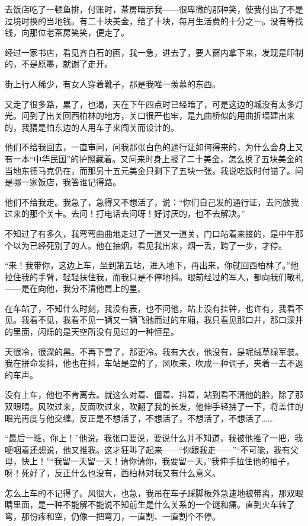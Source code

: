 \par 去饭店吃了一顿鱼排，付账时，茶房暗示我——很卑微的那种笑，使我付出了不是过境时换的当地钱。有二十块美金，给了十块，每月生活费的十分之一。没有等找钱，向那位老茶房笑笑，便走了。
\par 经过一家书店，看见齐白石的画，我一急，进去了，要人窗内拿下来，发现是印制的，不是原墨，就谢了走开。
\par 街上行人稀少，有女人穿着靴子，那是我唯一羡慕的东西。
\par 又走了很多路，累了，也渴，天在下午四点时已经暗了，可是这边的城没有太多灯光。问到了出关回西柏林的地方，关口很严也牢，是九曲桥似的用曲折墙建出来的，我猜是怕东边的人用车子来闯关而设计的。
\par 他们不给我回去，一直审问，问我那张白色的通行证如何得来的，为什么会身上又有一本“中华民国”的护照藏着。又问来时身上报了二十美金，怎么换了五块美金的当地东德马克仍在，而那另十五元美金只剩下了五块一张。我说吃饭时付错了。问是哪一家饭店，我答谁记得路。
\par 他们不给我走。我急了，急得又不想活了，说：“你们自己发的通行证，去问放我过来的那个关卡。去问！打电话去问呀！好讨厌的，也不去解决。”
\par 不知过了有多久，我弯弯曲曲地走过了一道又一道关，门口站着来接的，是中午那个以为已经死别了的人。他在抽烟，看见我出来，烟一丢，跨了一步，才停。
\par “来！我带你，这边上车，坐到第五站，进入地下，再出来，你就回西柏林了。”他拉住我的手臂，轻轻扶住我，而我只是不停地抖。眼前经过的军人，都向我们敬礼——是在向他，我分不清他肩上的星。
\par 在车站了，不知什么时刻，我没有表，也不问他，站上没有挂钟，也许有，我看不见。我看不见，我看不见一辆又一辆飞驰而过的车厢，我只看见那口井，那口深井的里面，闪烁的是天空所没有见过的一种恒星。
\par 天很冷，很深的黑。不再下雪了，那更冷。我有大衣，他没有，是呢绒草绿军装。我在拼命发抖，他也在抖，车站是空的了，风吹来，吹成一种调子，夹着一去不返的车声。
\par 没有上车，他也不肯离去。就这么对着、僵着、抖着，站到看不清他的脸，除了那双眼睛。风吹过来，反面吹过来，吹翻了我的长发，他伸手轻拂了一下，将盖住的眼光再度与他交缠。反正是不想活了，不想活了，不想活了，不想活了……
\par “最后一班，你上！”他说。我张口要说，要说什么并不知道，我被他推了一把，我哽咽着还想说，他又推我。这才狂叫了起来——“你跟我走——”“不可能，我有父母，快上！”“我留一天留一天！请你请你，我要留一天。”我伸手拉住他的袖子，呀！死好了，反正什么也没有，西柏林对我又有什么意义。
\par 怎么上车的不记得了。风很大，也急，我吊在车子踩脚板外急速地被带离，那双眼睛里面，是一种不能解不能说不知前生是什么关系的一个谜和痛。直到火车转了弯，那份疼和空，仍像一把弯刀，一直割、一直割个不停。
